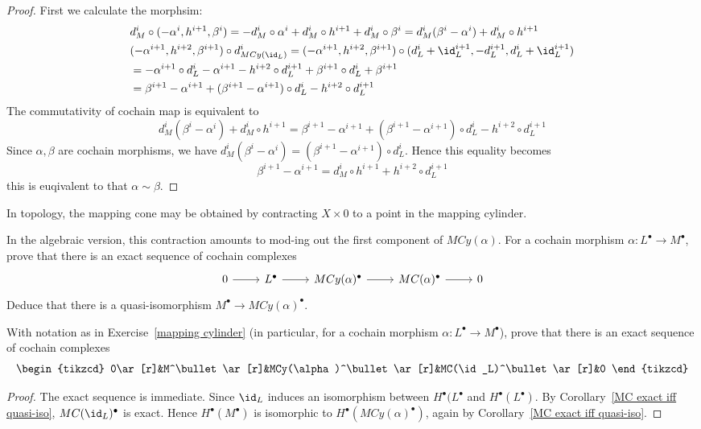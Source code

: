 \begin{proof}
First we calculate the morphsim:
\begin{align*}
&d_M^{i}\circ(-\alpha^i,h^{i+1},\beta^i)=-d_M^i\circ\alpha^i+d_M^{i}\circ h^{i+1}+d_M^{i}\circ\beta^i=d_M^i(\beta^i-\alpha^i)+d_M^i\circ h^{i+1}\\
&(-\alpha^{i+1},h^{i+2},\beta^{i+1})\circ d_{MCy(\id_L)}^{i}=(-\alpha^{i+1},h^{i+2},\beta^{i+1})\circ(d_L^i+\id_L^{i+1},-d_L^{i+1},d_L^i+\id_L^{i+1})\\
&=-\alpha^{i+1}\circ d_L^i-\alpha^{i+1}-h^{i+2}\circ d_L^{i+1}+\beta^{i+1}\circ d_L^i+\beta^{i+1}\\
&=\beta^{i+1}-\alpha^{i+1}+(\beta^{i+1}-\alpha^{i+1})\circ d_L^i-h^{i+2}\circ d_L^{i+1}
\end{align*}
The commutativity of cochain map is equivalent to
\[d_M^i(\beta^i-\alpha^i)+d_M^i\circ h^{i+1}=\beta^{i+1}-\alpha^{i+1}+(\beta^{i+1}-\alpha^{i+1})\circ d_L^i-h^{i+2}\circ d_L^{i+1}\]
Since $\alpha,\beta$ are cochain morphisms, we have $d_M^i(\beta^i-\alpha^i)=(\beta^{i+1}-\alpha^{i+1})\circ d_L^i$. Hence this equality becomes
\[\beta^{i+1}-\alpha^{i+1}=d_M^i\circ h^{i+1}+h^{i+2}\circ d_L^{i+1}\]
this is euqivalent to that $\alpha\sim\beta$.
\end{proof}
\begin{exercise}
In topology, the mapping cone may be obtained by contracting $X\times0$ to a point in the mapping cylinder.\par
In the algebraic version, this contraction amounts to mod-ing out the first component of $MCy(\alpha)$. For a cochain morphism $\alpha:L^\bullet\to M^\bullet$, prove that there is an exact sequence of cochain complexes
\[\begin{tikzcd}
0\ar[r]&L^\bullet\ar[r]&MCy(\alpha)^\bullet\ar[r]&MC(\alpha)^\bullet\ar[r]&0
\end{tikzcd}\]
Deduce that there is a quasi-isomorphism $M^\bullet\to MCy(\alpha)^\bullet$.
\end{exercise}
\begin{exercise}
With notation as in Exercise~\ref{mapping cylinder} (in particular, for a cochain morphism $\alpha:L^\bullet\to M^\bullet$), prove that there is an exact sequence of cochain complexes
\[\begin{tikzcd}
0\ar[r]&M^\bullet\ar[r]&MCy(\alpha)^\bullet\ar[r]&MC(\id_L)^\bullet\ar[r]&0
\end{tikzcd}\]
\end{exercise}
\begin{proof}
The exact sequence is immediate. Since $\id_L$ induces an isomorphism between $H^\bullet(L^\bullet$ and $H^\bullet(L^\bullet)$. By Corollary~\ref{MC exact iff quasi-iso}, $MC(\id_L)^\bullet$ is exact. Hence $H^\bullet(M^\bullet)$ is isomorphic to $H^\bullet(MCy(\alpha)^\bullet)$, again by Corollary~\ref{MC exact iff quasi-iso}.
\end{proof}
